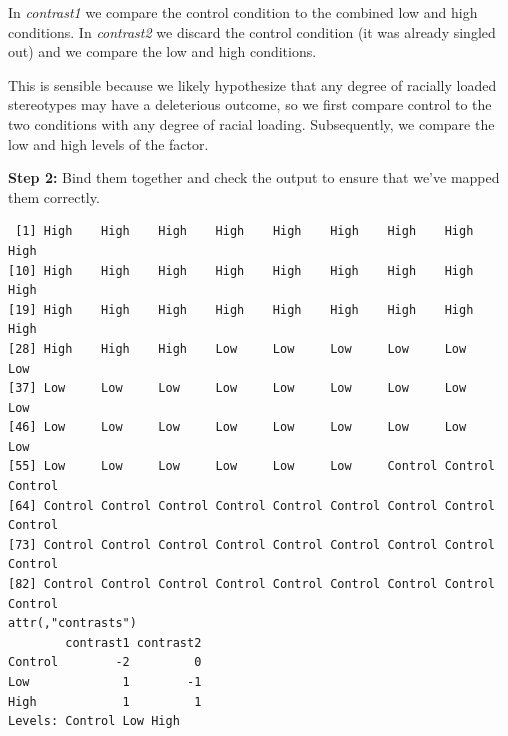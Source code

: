 \documentclass[
  11pt,
]{book}
\newenvironment{Shaded}{\begin{snugshade}}{\end{snugshade}}
\newcommand{\CommentTok}[1]{\textcolor[rgb]{0.56,0.35,0.01}{\textit{#1}}}
\newcommand{\DecValTok}[1]{\textcolor[rgb]{0.00,0.00,0.81}{#1}}
\newcommand{\FunctionTok}[1]{\textcolor[rgb]{0.00,0.00,0.00}{#1}}
\newcommand{\NormalTok}[1]{#1}
\newcommand{\OtherTok}[1]{\textcolor[rgb]{0.56,0.35,0.01}{#1}}
\newcommand{\SpecialCharTok}[1]{\textcolor[rgb]{0.00,0.00,0.00}{#1}}
\begin{document}
In \emph{contrast1} we compare the control condition to the combined low and high conditions.
In \emph{contrast2} we discard the control condition (it was already singled out) and we compare the low and high conditions.

This is sensible because we likely hypothesize that any degree of racially loaded stereotypes may have a deleterious outcome, so we first compare control to the two conditions with any degree of racial loading. Subsequently, we compare the low and high levels of the factor.

\textbf{Step 2:} Bind them together and check the output to ensure that we've mapped them correctly.

\begin{Shaded}
\end{Shaded}

\begin{verbatim}
 [1] High    High    High    High    High    High    High    High    High   
[10] High    High    High    High    High    High    High    High    High   
[19] High    High    High    High    High    High    High    High    High   
[28] High    High    High    Low     Low     Low     Low     Low     Low    
[37] Low     Low     Low     Low     Low     Low     Low     Low     Low    
[46] Low     Low     Low     Low     Low     Low     Low     Low     Low    
[55] Low     Low     Low     Low     Low     Low     Control Control Control
[64] Control Control Control Control Control Control Control Control Control
[73] Control Control Control Control Control Control Control Control Control
[82] Control Control Control Control Control Control Control Control Control
attr(,"contrasts")
        contrast1 contrast2
Control        -2         0
Low             1        -1
High            1         1
Levels: Control Low High
\end{verbatim}
\end{document}
